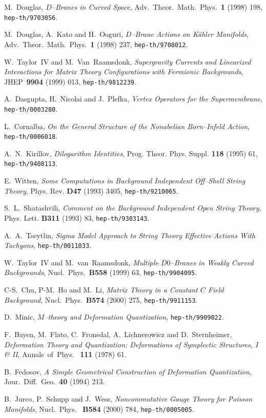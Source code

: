 \documentclass[a4paper,11pt]{article}
\begin{document}
\begin{thebibliography}{99}
{  {\small M.~Douglas, \textit{$D$--Branes in Curved Space},
Adv.\ Theor.\ Math.\ Phys.\ \textbf{1} (1998) 198, \texttt{hep-th/9703056}. }

  {\small M.~Douglas, A.~Kato and H.~Ooguri, \textit{$D$--Brane
Actions on K\"ahler Manifolds}, Adv.\ Theor.\ Math.\ Phys.\ \textbf{1}
(1998) 237, \texttt{hep-th/9708012}. }

  {\small W.~Taylor~IV and M.~Van~Raamsdonk, 
\textit{Supergravity Currents and Linearized Interactions for Matrix Theory
Configurations with Fermionic Backgrounds}, JHEP\ \textbf{9904} (1999) 013, 
\texttt{hep-th/9812239}. }

  {\small A.~Dasgupta, H.~Nicolai and J.~Plefka, \textit{Vertex
Operators for the Supermembrane}, \texttt{hep-th/0003280}. }

  {\small L.~Cornalba, \textit{On the General 
Structure of the Nonabelian Born--Infeld Action}, 
\texttt{hep-th/0006018}. }

  {\small A.~N.~Kirillov, \textit{Dilogarithm 
Identities}, Prog. Theor. Phys. Suppl. \textbf{118} (1995) 61, 
\texttt{hep-th/9408113}. }

  {\small E.~Witten, \textit{Some Computations in 
Background Independent Off--Shell String Theory}, Phys. Rev. 
\textbf{D47} (1993) 3405, \texttt{hep-th/9210065}. }

  {\small S.~L.~Shatashvili, \textit{Comment on 
the Background Independent Open String Theory}, Phys. Lett. 
\textbf{B311} (1993) 83, \texttt{hep-th/9303143}. }

  {\small A.~A.~Tseytlin, \textit{Sigma Model 
Approach to String Theory Effective Actions With Tachyons}, 
\texttt{hep-th/0011033}. }

  {\small W.~Taylor~IV and M.~van~Raamsdonk, 
\textit{Multiple $D0$--Branes in Weakly Curved Backgrounds}, Nucl.\ Phys.\ 
\textbf{B558} (1999) 63, \texttt{hep-th/9904095}. }

  {\small C-S.~Chu, P-M.~Ho and M.~Li, \textit{Matrix Theory in
a Constant $C$ Field Background}, Nucl.\ Phys.\ \textbf{B574} (2000) 275, 
\texttt{hep-th/9911153}. }

  {\small D.~Minic, \textit{$M$--theory and Deformation
Quantization}, \texttt{hep-th/9909022}. }

  {\small F.~Bayen, M.~Flato, C.~Fronsdal, A.~Lichnerowicz
and D.~Sternheimer, \textit{Deformation Theory and Quantization:
Deformations of Symplectic Structures, I \& II}, Annals\ of\ Phys.\ \textbf{
111} (1978) 61. }

  {\small B.~Fedosov, \textit{A Simple Geometrical
Construction of Deformation Quantization}, Jour.\ Diff.\ Geo.\ \textbf{40}
(1994) 213. }

  {\small B.~Jurco, P.~Schupp and J.~Wess, \textit{
Noncommutative Gauge Theory for Poisson Manifolds}, Nucl.\ Phys.\ \textbf{
B584} (2000) 784, \texttt{hep-th/0005005}. }

}

\end{thebibliography}
\end{document}

